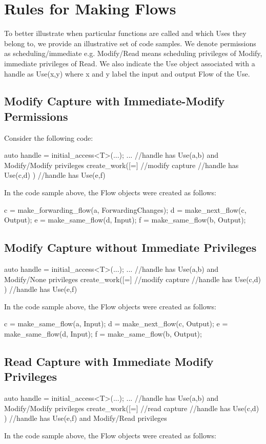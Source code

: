 
\chapter{Rules for Making Flows}
To better illustrate when particular  functions are called
and which Uses they belong to, we provide an illustrative set of code samples.
We denote permissions as scheduling/immediate e.g. Modify/Read means scheduling privileges of Modify,
immediate privileges of Read.  We also indicate the Use object associated with a handle as Use(x,y)
where x and y label the input and output Flow of the Use.

\section{Modify Capture with Immediate-Modify Permissions}
Consider the following code:
\begin{CppCode}
auto handle = initial_access<T>(...);
...
//handle has Use(a,b) and Modify/Modify privileges
create_work([=]{ //modify capture
  //handle has Use(c,d)
})
//handle has Use(e,f)
\end{CppCode}
In the code sample above, the Flow objects were created as follows:

\begin{CppCode}
c = make_forwarding_flow(a, ForwardingChanges);
d = make_next_flow(c, Output);
e = make_same_flow(d, Input);
f = make_same_flow(b, Output);
\end{CppCode}

\section{Modify Capture without Immediate Privileges}
\begin{CppCode}
auto handle = initial_access<T>(...);
...
//handle has Use(a,b) and Modify/None privileges
create_work([=]{ //modify capture
  //handle has Use(c,d)
})
//handle has Use(e,f)
\end{CppCode}
In the code sample above, the Flow objects were created as follows:

\begin{CppCode}
c = make_same_flow(a, Input);
d = make_next_flow(c, Output);
e = make_same_flow(d, Input);
f = make_same_flow(b, Output);
\end{CppCode}

\section{Read Capture with Immediate Modify Privileges}
\begin{CppCode}
auto handle = initial_access<T>(...);
...
//handle has Use(a,b) and Modify/Modify privileges
create_work([=]{ //read capture
  //handle has Use(c,d)
})
//handle has Use(e,f) and Modify/Read privileges
\end{CppCode}
In the code sample above, the Flow objects were created as follows:

